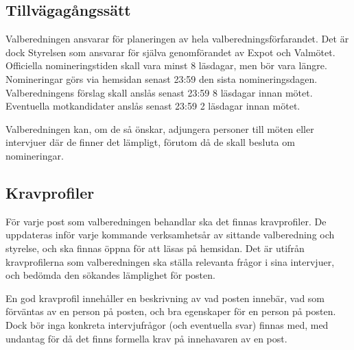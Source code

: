\documentclass[10pt]{article}
\begin{document}
\subsection{Tillvägagångssätt}
Valberedningen ansvarar för planeringen av hela valberedningsförfarandet. Det är dock Styrelsen som ansvarar för själva genomförandet av Expot och Valmötet. Officiella nomineringstiden skall vara minst 8 läsdagar, men bör vara längre. Nomineringar görs via hemsidan senast 23:59 den sista nomineringsdagen. Valberedningens förslag skall anslås senast 23:59 8 läsdagar innan mötet. Eventuella motkandidater anslås senast 23:59 2 läsdagar innan mötet.

Valberedningen kan, om de så önskar, adjungera personer till möten eller intervjuer där de finner det lämpligt, förutom då de skall besluta om nomineringar.
\subsection{Kravprofiler}
För varje post som valberedningen behandlar ska det finnas kravprofiler. De uppdateras inför varje kommande verksamhetsår av sittande valberedning och styrelse, och ska finnas öppna för att läsas på hemsidan. Det är utifrån kravprofilerna som valberedningen ska ställa relevanta frågor i sina intervjuer, och bedömda den sökandes lämplighet för posten.

En god kravprofil innehåller en beskrivning av vad posten innebär, vad som förväntas av en person på posten, och bra egenskaper för en person på posten. Dock bör inga konkreta intervjufrågor (och eventuella svar) finnas med, med undantag för då det finns formella krav på innehavaren av en post.
\end{document}
